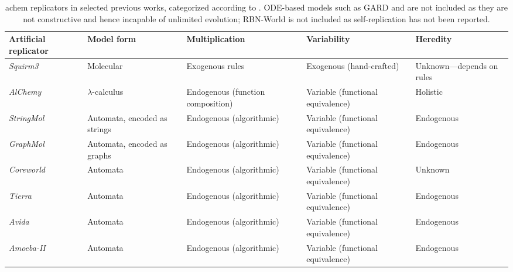 \begin{table}
	\scriptsize
	\begin{center}
		\caption[\Gls{achem} replicators in selected previous works, categorized according to Zachar and Szathm\'ary (2010).]{\Gls{achem} replicators in selected previous works, categorized according to \textcite{Zachar2010}. ODE-based models such as GARD and \textcite{Vasas2012} are not included as they are not \gls{constructive} and hence incapable of unlimited evolution; RBN-World \parencite{Faulconbridge2010} is not included as self-replication has not been reported.}
		\label{tbl:previous-work}
		\begin{tabular}{@{}p{3.5cm}p{1.5cm}p{3.5cm}p{3.5cm}p{2cm}@{}}
			\toprule
			Artificial replicator            						& Model form					& Multiplication					& Variability						& Heredity\\ 
			\midrule
			\emph{Squirm3} \parencite{Hutton2002}                   & Molecular						& Exogenous rules					& Exogenous (hand-crafted)			& Unknown---depends on rules\\
			\emph{AlChemy} \parencite{Fontana1992}					& $\lambda$-calculus			& Endogenous (function composition)	& Variable (functional equivalence)  & Holistic\\
			\emph{StringMol} \parencite{Hickinbotham2012}           & Automata, encoded as strings	& Endogenous (algorithmic)			& Variable (functional equivalence)	& Endogenous\\
			\emph{GraphMol} \parencite{Nellis2014}					& Automata, encoded as graphs	& Endogenous (algorithmic)			& Variable (functional equivalence)	& Endogenous\\
			\emph{Coreworld} \parencite{Rasmussen1990} 				& Automata						& Endogenous (algorithmic)			& Variable (functional equivalence)	& Unknown\\
			\emph{Tierra} \parencite{Ray1991} 						& Automata						& Endogenous (algorithmic)			& Variable (functional equivalence)	& Endogenous\\
			\emph{Avida} \parencite{Ofria2004} 						& Automata						& Endogenous (algorithmic)			& Variable (functional equivalence)	& Endogenous\\
			\emph{Amoeba-II} \parencite{Pargellis2001}				& Automata						& Endogenous (algorithmic)			& Variable (functional equivalence)	& Endogenous\\
			\bottomrule
		\end{tabular}
	\end{center}
\end{table}

